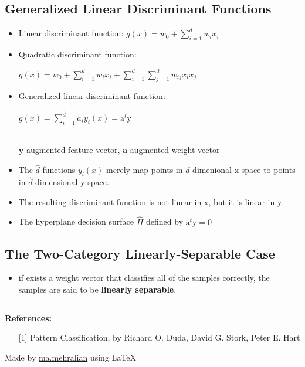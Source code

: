 \documentclass{../cheat}
\begin{document}
\begin{multicols}{3}
		\subsection{Generalized Linear Discriminant Functions}
		\begin{itemize}
			\item Linear discriminant function: $g(x) = w_0 + \sum_{i=1}^{d} w_i x_i$
			\item Quadratic discriminant function:\\
				\centerline{$g(x) = w_0 + \sum_{i=1}^{d} w_i x_i + \sum_{i=1}^{d} \sum_{j=1}^{d} w_{ij} x_i x_j$}
			\item Generalized linear discriminant function:\\
				\centerline{$g(x) =  \sum_{i=1}^{\hat{d}} a_i y_i(x)=\mathrm{a}^t \mathrm{y}$}\\
				$\mathbf{y}$ augmented feature vector, $\mathbf{a}$ augmented weight vector
			\item The $\hat{d}$ functions $y_i(x)$ merely map points in $d$-dimenional $\mathrm{x}$-space to points in $\hat{d}$-dimensional $\mathrm{y}$-space.
			\item The resulting discriminant function is not linear in $\mathrm{x}$, but it is linear in $\mathrm{y}$.
			\item The hyperplane decision surface $\hat{H}$ defined by $\mathrm{a}^t \mathrm{y}=0$
			
		\end{itemize}
		
		
		\subsection{The Two-Category Linearly-Separable Case}
		\begin{itemize}
			\item if exists a weight vector that classifies all of the samples correctly, the samples are said to be \textbf{linearly separable}.
		\end{itemize}
	
\vspace{5mm}
\rule{0.3\linewidth}{0.25pt}
\scriptsize

\textbf{References:}
\begin{itemize}[leftmargin=2em]
	\item [{[1]}] Pattern Classification, by Richard O. Duda, David G. Stork, Peter E. Hart
\end{itemize}
Made by \href{http://webpages.iust.ac.ir/mehralian/}{ma.mehralian} using \LaTeX
\end{multicols}
\end{document}
